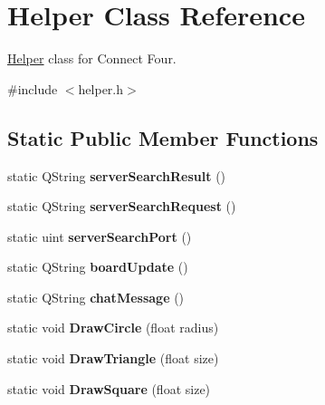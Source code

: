 \hypertarget{class_helper}{\section{Helper Class Reference}
\label{class_helper}
}


\hyperlink{class_helper}{Helper} class for Connect Four.  




{\ttfamily \#include $<$helper.\-h$>$}

\subsection*{Static Public Member Functions}
\begin{DoxyCompactItemize}
\item 
\hypertarget{class_helper_a63b53176165ddc6d82677009e27334ef}{static Q\-String {\bfseries server\-Search\-Result} ()}\label{class_helper_a63b53176165ddc6d82677009e27334ef}

\item 
\hypertarget{class_helper_a38336498f52ddebd8c711407c0d0504b}{static Q\-String {\bfseries server\-Search\-Request} ()}\label{class_helper_a38336498f52ddebd8c711407c0d0504b}

\item 
\hypertarget{class_helper_a8facbf43c227514834b49391ef476740}{static uint {\bfseries server\-Search\-Port} ()}\label{class_helper_a8facbf43c227514834b49391ef476740}

\item 
\hypertarget{class_helper_a13ac9ee4039795a9b27bc38a81b9f870}{static Q\-String {\bfseries board\-Update} ()}\label{class_helper_a13ac9ee4039795a9b27bc38a81b9f870}

\item 
\hypertarget{class_helper_aae6bf6a7d72c0ec9871fbe7c328236fa}{static Q\-String {\bfseries chat\-Message} ()}\label{class_helper_aae6bf6a7d72c0ec9871fbe7c328236fa}

\item 
\hypertarget{class_helper_ae7ae04b5ed393589228994c9ce203cac}{static void {\bfseries Draw\-Circle} (float radius)}\label{class_helper_ae7ae04b5ed393589228994c9ce203cac}

\item 
\hypertarget{class_helper_aa9b0b92a5842b0daf41108b9940bbe44}{static void {\bfseries Draw\-Triangle} (float size)}\label{class_helper_aa9b0b92a5842b0daf41108b9940bbe44}

\item 
\hypertarget{class_helper_a1624591dac426f4491d28a92e6f4a3ac}{static void {\bfseries Draw\-Square} (float size)}\label{class_helper_a1624591dac426f4491d28a92e6f4a3ac}


\end{DoxyCompactItemize}
